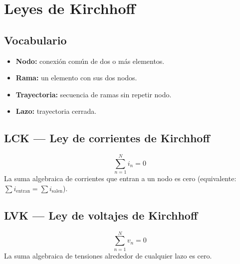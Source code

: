 \documentclass[11pt,a4paper]{article}
\begin{document}
\section{Leyes de Kirchhoff}

\subsection{Vocabulario}
\begin{itemize}
  \item \textbf{Nodo:} conexión común de dos o más elementos.
  \item \textbf{Rama:} un elemento con sus dos nodos.
  \item \textbf{Trayectoria:} secuencia de ramas sin repetir nodo.
  \item \textbf{Lazo:} trayectoria cerrada.
\end{itemize}

\subsection{LCK --- Ley de corrientes de Kirchhoff}
\begin{equation}
\sum_{n=1}^{N} i_n = 0 \tag{2.18--2.19}
\end{equation}
La suma algebraica de corrientes que entran a un nodo es cero
(equivalente: \(\sum i_{\mathrm{entran}}=\sum i_{\mathrm{salen}}\)).

\begin{center}
\end{center}

\subsection{LVK --- Ley de voltajes de Kirchhoff}
\begin{equation}
\sum_{n=1}^{N} v_n = 0 \tag{2.20--2.21}
\end{equation}
La suma algebraica de tensiones alrededor de cualquier lazo es cero.
\end{document}
